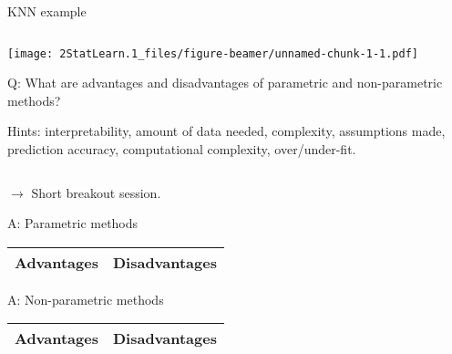 \documentclass[ignorenonframetext,]{beamer}
\begin{document}
\begin{frame}

\begin{block}{KNN example}

\(~\)

\texttt{[image: 2StatLearn.1\_files/figure-beamer/unnamed-chunk-1-1.pdf]}

\end{block}

\end{frame}

\begin{frame}

\begin{block}{Q: What are advantages and disadvantages of parametric and
non-parametric methods?}

\vspace{2mm}

Hints: interpretability, amount of data needed, complexity, assumptions
made, prediction accuracy, computational complexity, over/under-fit.

\(~\)

\(\rightarrow\) Short breakout session.

\end{block}

\end{frame}

\begin{frame}

\begin{block}{A: Parametric methods}

\begin{longtable}[]{@{}ll@{}}
\toprule
Advantages & Disadvantages\tabularnewline
\midrule
\endhead
\bottomrule
\end{longtable}

\end{block}

\end{frame}

\begin{frame}

\begin{block}{A: Non-parametric methods}

\begin{longtable}[]{@{}ll@{}}
\toprule
Advantages & Disadvantages\tabularnewline
\midrule
\endhead
\bottomrule
\end{longtable}

\end{block}

\end{frame}
\end{document}
